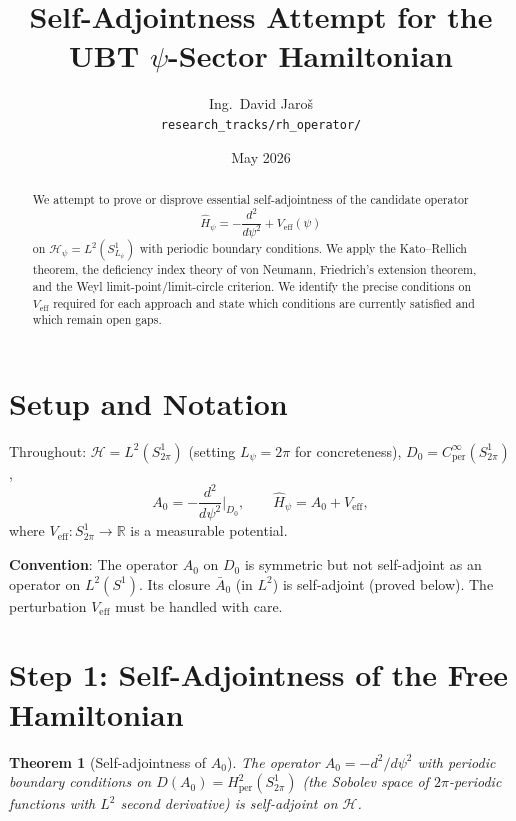 \documentclass[11pt,a4paper]{article}
\title{Self-Adjointness Attempt for the UBT $\psi$-Sector Hamiltonian}
\author{Ing.\ David Jaro\v{s}\\
\small \texttt{research\_tracks/rh\_operator/}}
\date{May 2026}
\newtheorem{theorem}{Theorem}
\begin{document}
\maketitle

\begin{abstract}
We attempt to prove or disprove essential self-adjointness of the candidate
operator
\[
  \hat{H}_\psi = -\frac{d^2}{d\psi^2} + V_\mathrm{eff}(\psi)
\]
on $\mathscr{H}_\psi = L^2(S^1_{L_\psi})$ with periodic boundary conditions.
We apply the Kato--Rellich theorem, the deficiency index theory of von Neumann,
Friedrich's extension theorem, and the Weyl limit-point/limit-circle criterion.
We identify the precise conditions on $V_\mathrm{eff}$ required for each approach
and state which conditions are currently satisfied and which remain open gaps.
\end{abstract}

\tableofcontents

\section{Setup and Notation}

Throughout: $\mathscr{H} = L^2(S^1_{2\pi})$ (setting $L_\psi = 2\pi$ for
concreteness), $D_0 = C^\infty_\mathrm{per}(S^1_{2\pi})$,
\[
  A_0 = -\frac{d^2}{d\psi^2}\bigg|_{D_0}, \qquad
  \hat{H}_\psi = A_0 + V_\mathrm{eff},
\]
where $V_\mathrm{eff}: S^1_{2\pi} \to \mathbb{R}$ is a measurable potential.

\textbf{Convention}: The operator $A_0$ on $D_0$ is symmetric but not
self-adjoint as an operator on $L^2(S^1)$.  Its closure $\bar{A}_0$
(in $L^2$) is self-adjoint (proved below).  The perturbation $V_\mathrm{eff}$
must be handled with care.

\section{Step 1: Self-Adjointness of the Free Hamiltonian}

\begin{theorem}[Self-adjointness of $A_0$]
  \label{thm:freeH}
  The operator $A_0 = -d^2/d\psi^2$ with periodic boundary conditions
  on $D(A_0) = H^2_\mathrm{per}(S^1_{2\pi})$ (the Sobolev space of
  $2\pi$-periodic functions with $L^2$ second derivative) is self-adjoint
  on $\mathscr{H}$.
\end{theorem}
\end{document}
